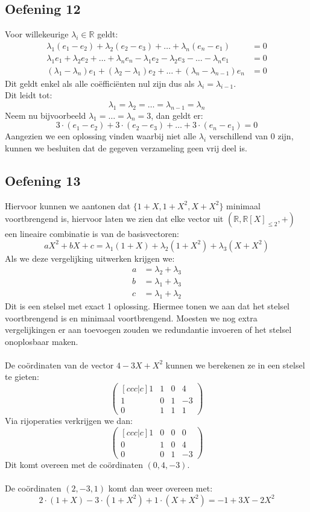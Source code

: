 \documentclass[lineaire_algebra_oplossingen.tex]{subfiles}
\begin{document}
\subsection{Oefening 12}
Voor willekeurige $\lambda_i \in \mathbb{R}$ geldt:
\begin{align*}
\lambda_1(e_1-e_2) + \lambda_2 (e_2-e_3) + \ldots + \lambda_n(e_n-e_1) &=0 \\
\lambda_1e_1 + \lambda_2e_2 + \ldots + \lambda_ne_n - \lambda_1e_2 - \lambda_2e_3 - \ldots - \lambda_ne_1 &=0 \\
(\lambda_1 - \lambda_n)e_1 + (\lambda_2 - \lambda_1)e_2 + \ldots + (\lambda_n - \lambda_{n-1})e_n &=0
\end{align*}
Dit geldt enkel als alle co\"effici\"enten nul zijn dus als $\lambda_i = \lambda_{i-1}$.\\
Dit leidt tot:
\[
\lambda_1 = \lambda_2 = \ldots = \lambda_{n-1} = \lambda_n
\]
Neem nu bijvoorbeeld $\lambda_1 = \ldots = \lambda_n = 3$, dan geldt er:
\[
3\cdot(e_1-e_2) + 3\cdot(e_2-e_3) + \ldots + 3\cdot(e_n-e_1) = 0
\]
Aangezien we een oplossing vinden waarbij niet alle $\lambda_i$ verschillend van 0 zijn, kunnen we besluiten dat de gegeven verzameling geen vrij deel is.

\subsection{Oefening 13}
Hiervoor kunnen we aantonen dat $\{1+X,1+X^2,X+X^2\}$ minimaal voortbrengend is, hiervoor laten we zien dat elke vector uit  $(\mathbb{R},\mathbb{R}[X]_{\leq 2},+)$ een lineaire combinatie is van de basisvectoren:
\[
aX^2 + bX + c = \lambda_{1} (1+X) + \lambda_{2} (1+X^2) + \lambda_{3} (X+X^2)
\]
Als we deze vergelijking uitwerken krijgen we:
\begin{align*}
a &= \lambda_2 + \lambda_3 \\
b &= \lambda_1 + \lambda_3 \\
c &= \lambda_1 + \lambda_2
\end{align*}
Dit is een stelsel met exact 1 oplossing. Hiermee tonen we aan dat het stelsel voortbrengend is en minimaal voortbrengend. Moesten we nog extra vergelijkingen er aan toevoegen zouden we redundantie invoeren of het stelsel onoplosbaar maken.
\\
\\
De co\"ordinaten van de vector $4 -3X + X^2$ kunnen we berekenen ze in een stelsel te gieten:
$$
\begin{pmatrix}[ccc|c]
1&1&0&4\\
1&0&1&-3\\
0&1&1&1
\end{pmatrix}
$$
Via rijoperaties verkrijgen we dan:
$$
\begin{pmatrix}[ccc|c]
1&0&0&0\\
0&1&0&4\\
0&0&1&-3
\end{pmatrix}
$$
Dit komt overeen met de co\"ordinaten $(0,4,-3)$.
\\
\\
De co\"ordinaten $(2,-3,1)$ komt dan weer overeen met:
$$
2\cdot (1+X) -3 \cdot (1+X^2)+ 1\cdot (X+X^2)= -1 +3X-2X^2
$$
\end{document}
